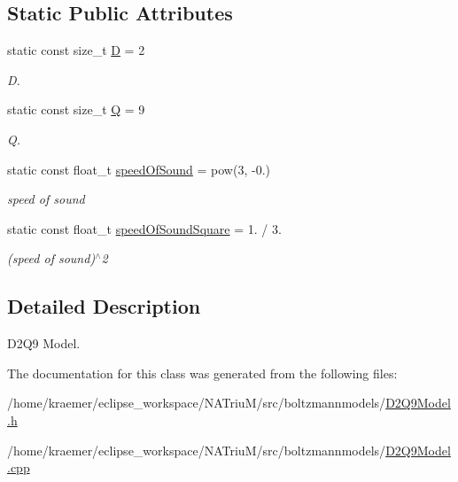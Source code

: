 \subsection*{\-Static \-Public \-Attributes}
\begin{DoxyCompactItemize}
\item 
\hypertarget{classnatrium_1_1D2Q9Model_a81532a1067ba5f280698a1a84711ede5}{static const size\-\_\-t \hyperlink{classnatrium_1_1D2Q9Model_a81532a1067ba5f280698a1a84711ede5}{\-D} = 2}\label{classnatrium_1_1D2Q9Model_a81532a1067ba5f280698a1a84711ede5}

\begin{DoxyCompactList}\small\item\em \-D. \end{DoxyCompactList}\item 
\hypertarget{classnatrium_1_1D2Q9Model_ad3d102dfb9c8ad7b56a8f82c3f4286f6}{static const size\-\_\-t \hyperlink{classnatrium_1_1D2Q9Model_ad3d102dfb9c8ad7b56a8f82c3f4286f6}{\-Q} = 9}\label{classnatrium_1_1D2Q9Model_ad3d102dfb9c8ad7b56a8f82c3f4286f6}

\begin{DoxyCompactList}\small\item\em \-Q. \end{DoxyCompactList}\item 
\hypertarget{classnatrium_1_1D2Q9Model_a2c880c8497c8f632af008bba4ab607e1}{static const float\-\_\-t \hyperlink{classnatrium_1_1D2Q9Model_a2c880c8497c8f632af008bba4ab607e1}{speed\-Of\-Sound} = pow(3, -\/0.)}\label{classnatrium_1_1D2Q9Model_a2c880c8497c8f632af008bba4ab607e1}

\begin{DoxyCompactList}\small\item\em speed of sound \end{DoxyCompactList}\item 
\hypertarget{classnatrium_1_1D2Q9Model_adc09f6587a0703b4e354cb2a732a6fbe}{static const float\-\_\-t \hyperlink{classnatrium_1_1D2Q9Model_adc09f6587a0703b4e354cb2a732a6fbe}{speed\-Of\-Sound\-Square} = 1. / 3.}\label{classnatrium_1_1D2Q9Model_adc09f6587a0703b4e354cb2a732a6fbe}

\begin{DoxyCompactList}\small\item\em (speed of sound)$^\wedge$2 \end{DoxyCompactList}\end{DoxyCompactItemize}


\subsection{\-Detailed \-Description}
\-D2\-Q9 \-Model. 

\-The documentation for this class was generated from the following files\-:\begin{DoxyCompactItemize}
\item 
/home/kraemer/eclipse\-\_\-workspace/\-N\-A\-Triu\-M/src/boltzmannmodels/\hyperlink{D2Q9Model_8h}{\-D2\-Q9\-Model.\-h}\item 
/home/kraemer/eclipse\-\_\-workspace/\-N\-A\-Triu\-M/src/boltzmannmodels/\hyperlink{D2Q9Model_8cpp}{\-D2\-Q9\-Model.\-cpp}\end{DoxyCompactItemize}
